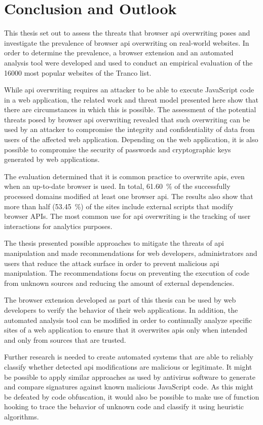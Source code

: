 \chapter{Conclusion and Outlook}
\label{sec.conclusion}

This thesis set out to assess the threats that browser \ac{api} overwriting poses and investigate the prevalence of browser \ac{api} overwriting on real-world websites. In order to determine the prevalence, a browser extension and an automated analysis tool were developed and used to conduct an empirical evaluation of the \num[round-precision=0]{16000} most popular websites of the Tranco list.

While \ac{api} overwriting requires an attacker to be able to execute JavaScript code in a web application, the related work and threat model presented here show that there are circumstances in which this is possible. The assessment of the potential threats posed by browser \ac{api} overwriting revealed that such overwriting can be used by an attacker to compromise the integrity and confidentiality of data from users of the affected web application. Depending on the web application, it is also possible to compromise the security of passwords and cryptographic keys generated by web applications.

The evaluation determined that it is common practice to overwrite \acsp{api}, even when an up-to-date browser is used. In total, \SI[round-precision=0]{61.60}{\percent} of the successfully processed domains modified at least one browser \ac{api}. The results also show that more than half (\SI[round-precision=0]{53.45}{\percent}) of the sites include external scripts that modify browser APIs. The most common use for \ac{api} overwriting is the tracking of user interactions for analytics purposes.

The thesis presented possible approaches to mitigate the threats of \ac{api} manipulation and made recommendations for web developers, administrators and users that reduce the attack surface in order to prevent malicious \ac{api} manipulation. The recommendations focus on preventing the execution of code from unknown sources and reducing the amount of external dependencies.

The browser extension developed as part of this thesis can be used by web developers to verify the behavior of their web applications. In addition, the automated analysis tool can be modified in order to continually analyze specific sites of a web application to ensure that it overwrites \acsp{api} only when intended and only from sources that are trusted.

Further research is needed to create automated systems that are able to reliably classify whether detected \ac{api} modifications are malicious or legitimate. It might be possible to apply similar approaches as used by antivirus software to generate and compare signatures against known malicious JavaScript code. As this might be defeated by code obfuscation, it would also be possible to make use of function hooking to trace the behavior of unknown code and classify it using heuristic algorithms.
